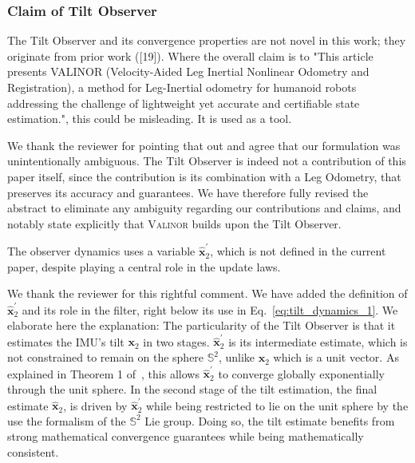 
\subsubsection{Claim of Tilt Observer}

\begin{revquote}
The Tilt Observer and its convergence properties are not novel in this work; they originate from prior work ([19]). Where the overall claim is to "This article presents VALINOR (Velocity-Aided Leg Inertial Nonlinear Odometry and Registration), a method for Leg-Inertial odometry for humanoid robots addressing the challenge of lightweight yet accurate and certifiable state estimation.", this could be misleading. It is used as a tool.
\end{revquote}

We thank the reviewer for pointing that out and agree that our formulation was unintentionally ambiguous. The Tilt Observer is indeed not a contribution of this paper itself, since the contribution is its combination with a Leg Odometry, that preserves its accuracy and guarantees. We have therefore fully revised the abstract to eliminate any ambiguity regarding our contributions and claims, and notably state explicitly that {\scshape Valinor} builds upon the Tilt Observer.

\begin{revquote}
The observer dynamics uses a variable $\hat{\boldsymbol{x}}_{2}^{\prime} $, which is not defined in the current paper, despite playing a central role in the update laws.
\end{revquote}

We thank the reviewer for this rightful comment. We have added the definition of $\hat{\boldsymbol{x}}_{2}^{\prime} $ and its role in the filter, right below its use in Eq.~\eqref{eq:tilt_dynamics_1}. We elaborate here the explanation:
The particularity of the Tilt Observer is that it estimates the IMU's tilt $\boldsymbol{x}_{2}$ in two stages. $\hat{\boldsymbol{x}}_{2}^{\prime} $ is its intermediate estimate, which is not constrained to remain on the sphere $\mathbb{S}^{2}$, unlike $\boldsymbol{x}_{2}$ which is a unit vector. As explained in Theorem 1 of~\cite{benallegue2020LyapunovStableOrientationEstimatorHumanoids}, this allows $\hat{\boldsymbol{x}}_{2}^{\prime} $ to converge globally exponentially through the unit sphere. In the second stage of the tilt estimation, the final estimate $\hat{\boldsymbol{x}}_{2}$, is driven by $\hat{\boldsymbol{x}}_{2}^{\prime}$ while being restricted to lie on the unit sphere by the use the formalism of the $\mathbb{S}^{2}$ Lie group. Doing so, the tilt estimate benefits from strong mathematical convergence guarantees while being mathematically consistent.


